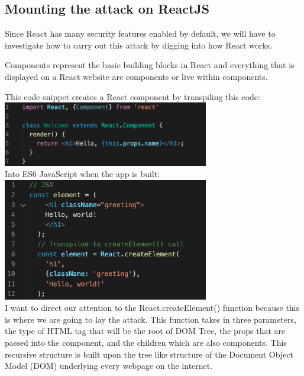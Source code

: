 \documentclass[conference]{IEEEtran}
\begin{document}
\subsection{Mounting the attack on ReactJS}

Since React has many security features enabled by default, we will have to investigate how to carry out this attack by digging into how React works.

Components represent the basic building blocks in React and everything that is displayed on a React website are components or live within components.

This code snippet creates a React component by transpiling this code:\\

\includegraphics[width = 9cm]{reactComponent.png}\\

Into ES6 JavaScript when the app is built:\\

\includegraphics[width = 9cm]{jsx.png}\\

I want to direct our attention to the React.createElement() function because this is where we are going to lay the attack. This function takes in three parameters, the type of HTML tag that will be the root of DOM Tree, the props that are passed into the component, and the children which are also components. This recursive structure is built upon the tree like structure of the Document Object Model (DOM) underlying every webpage on the internet.\\
\end{document}

